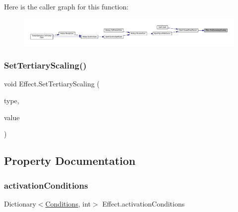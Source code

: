 Here is the caller graph for this function\+:\nopagebreak
\begin{figure}[H]
\begin{center}
\leavevmode
\includegraphics[width=350pt]{class_effect_a476b569a5adf97f1b691dcbb7e5cb325_icgraph}
\end{center}
\end{figure}
\mbox{\label{class_effect_a021b689f1ccd675bc1b6fefe3071253f}} 
\subsubsection{\texorpdfstring{SetTertiaryScaling()}{SetTertiaryScaling()}}
{\footnotesize\ttfamily void Effect.\+Set\+Tertiary\+Scaling (\begin{DoxyParamCaption}\item[{\mbox{\hyperlink{class_effect_af0ada789de40f58c24c46bf8ed2f300c}{Scaling\+Type}}}]{type,  }\item[{float}]{value }\end{DoxyParamCaption})}



\subsection{Property Documentation}
\mbox{\label{class_effect_abee804d3dd2ba5e3074d9fde9beedf07}} 
\subsubsection{\texorpdfstring{activationConditions}{activationConditions}}
{\footnotesize\ttfamily Dictionary$<$\mbox{\hyperlink{class_effect_ab13a718053e330a11f9f66a9b16f4686}{Conditions}}, int$>$ Effect.\+activation\+Conditions\hspace{0.3cm}{\ttfamily [get]}}

\mbox{\label{class_effect_a8a406c60ab681a1b0a68365042b32a44}} 
